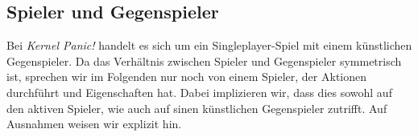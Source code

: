 \subsection{Spieler und Gegenspieler}

Bei \emph{Kernel Panic!} handelt es sich um ein Singleplayer-Spiel mit einem
künstlichen Gegenspieler. Da das Verhältnis zwischen Spieler und Gegenspieler
symmetrisch ist, sprechen wir im Folgenden nur noch von einem Spieler, der
Aktionen durchführt und Eigenschaften hat. Dabei implizieren wir, dass dies
sowohl auf den aktiven Spieler, wie auch auf sinen künstlichen Gegenspieler
zutrifft. Auf Ausnahmen weisen wir explizit hin.
